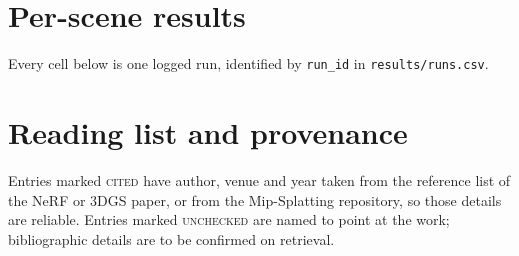\chapter{Per-scene results}
\label{app:perscene}
Every cell below is one logged run, identified by \texttt{run\_id} in
\texttt{results/runs.csv}.



\chapter{Reading list and provenance}
\label{app:reading}
Entries marked \textsc{cited} have author, venue and year taken from the
reference list of the NeRF or 3DGS paper, or from the Mip-Splatting repository,
so those details are reliable. Entries marked \textsc{unchecked} are named to
point at the work; bibliographic details are to be confirmed on retrieval.

